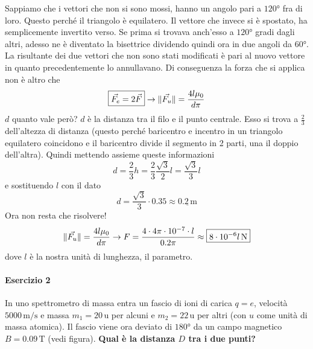 Sappiamo che i vettori che non si sono mossi, hanno un angolo pari a $\ang{120}$ fra di loro. Questo
perché il triangolo è equilatero. Il vettore che invece si è spostato, ha semplicemente invertito
verso. Se prima si trovava anch'esso a $\ang{120}$ gradi dagli altri, adesso ne è diventato la 
bisettrice dividendo quindi ora in due angoli da $\ang{60}$. La risultante dei due vettori che non 
sono stati modificati è pari al nuovo vettore in quanto precedentemente lo annullavano.
Di conseguenza la forza che si applica non è altro che
\begin{equation*}
  \boxed{\vec{F_e} = 2\vec{F}} \rightarrow \lVert\vec{F_u}\rVert = \frac{4l\mu_0}{d\pi}
\end{equation*}
$d$ quanto vale però? $d$ è la distanza tra il filo e il punto centrale. Esso si trova a $\frac{2}{3}$
dell'altezza di distanza (questo perché baricentro e incentro in un triangolo equilatero coincidono
e il baricentro divide il segmento in 2 parti, una il doppio dell'altra). Quindi mettendo assieme 
queste informazioni
\begin{equation*}
  d=\frac{2}{3}h = \frac{2}{3}\frac{\sqrt{3}}{2}l = \frac{\sqrt{3}}{3}l 
\end{equation*}
e sostituendo $l$ con il dato
\begin{equation*}
  d = \frac{\sqrt{3}}{3}\cdot0.35 \approx \underline{0.2\,\text{m}}
\end{equation*}
Ora non resta che risolvere!
\begin{equation*}
  \lVert\vec{F_u}\rVert = \frac{4l\mu_0}{d\pi} \rightarrow F = \frac{4\cdot4\pi\cdot10^{-7}\cdot l}{0.2\pi}
  \approx \boxed{8\cdot10^{-6}l\,\text{N}}
\end{equation*}
dove $l$ è la nostra unità di lunghezza, il parametro.

\paragraph{Esercizio 2}
In uno spettrometro di massa entra un fascio di ioni di carica $q=e$, velocità $5000\,\text{m/s}$ e
massa $m_1=20\,\text{u}$ per alcuni e $m_2=22\,\text{u}$ per altri (con $u$ come unità di massa 
atomica). Il fascio viene ora deviato di $\ang{180}$ da un campo magnetico $B=0.09\,\text{T}$ (vedi
figura). \textbf{Qual è la distanza $D$ tra i due punti?}

\begin{center}
\end{center}
\divisor

